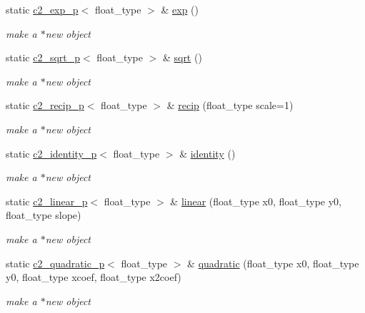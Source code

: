 \begin{DoxyCompactItemize}
static \hyperlink{classc2__exp__p}{c2\+\_\+exp\+\_\+p}$<$ float\+\_\+type $>$ \& \hyperlink{classc2__factory_ad6c29a455b386c1971e6614f6962f3da}{exp} ()
\begin{DoxyCompactList}\small\item\em make a $\ast$new object \end{DoxyCompactList}\item 
static \hyperlink{classc2__sqrt__p}{c2\+\_\+sqrt\+\_\+p}$<$ float\+\_\+type $>$ \& \hyperlink{classc2__factory_a5b189f66ec65267f3812cdc45ccf072d}{sqrt} ()
\begin{DoxyCompactList}\small\item\em make a $\ast$new object \end{DoxyCompactList}\item 
static \hyperlink{classc2__recip__p}{c2\+\_\+recip\+\_\+p}$<$ float\+\_\+type $>$ \& \hyperlink{classc2__factory_adda01279d6b1059843e2aecc5be5d95e}{recip} (float\+\_\+type scale=1)
\begin{DoxyCompactList}\small\item\em make a $\ast$new object \end{DoxyCompactList}\item 
static \hyperlink{classc2__identity__p}{c2\+\_\+identity\+\_\+p}$<$ float\+\_\+type $>$ \& \hyperlink{classc2__factory_a66970667d203c0e63a016b08d2472dc4}{identity} ()
\begin{DoxyCompactList}\small\item\em make a $\ast$new object \end{DoxyCompactList}\item 
static \hyperlink{classc2__linear__p}{c2\+\_\+linear\+\_\+p}$<$ float\+\_\+type $>$ \& \hyperlink{classc2__factory_a2113dc577f24931e0cf316137faf557c}{linear} (float\+\_\+type x0, float\+\_\+type y0, float\+\_\+type slope)
\begin{DoxyCompactList}\small\item\em make a $\ast$new object \end{DoxyCompactList}\item 
static \hyperlink{classc2__quadratic__p}{c2\+\_\+quadratic\+\_\+p}$<$ float\+\_\+type $>$ \& \hyperlink{classc2__factory_a4fb1852ab65ee1c0d62196a260f0df8f}{quadratic} (float\+\_\+type x0, float\+\_\+type y0, float\+\_\+type xcoef, float\+\_\+type x2coef)
\begin{DoxyCompactList}\small\item\em make a $\ast$new object \end{DoxyCompactList}\item 

\end{DoxyCompactItemize}
